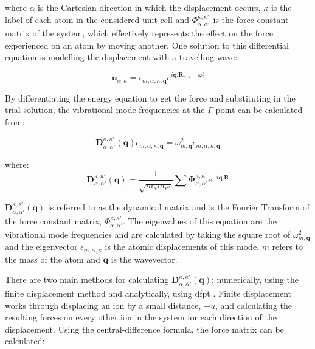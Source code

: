 where \(\alpha\) is the Cartesian direction in which the displacement occurs, \(\kappa\) is the label of each atom in the considered unit cell and \(\Phi_{\alpha, \alpha'}^{\kappa, \kappa'}\) is the force constant matrix of the system, which effectively represents the effect on the force experienced on an atom by moving another. One solution to this differential equation is modelling the displacement with a travelling wave:

\begin{equation}
\boldsymbol{u}_{\alpha, \kappa} = \epsilon_{m, \alpha, \kappa, \boldsymbol{q}}e^{i\boldsymbol{q}.\boldsymbol{R}_{\alpha, \kappa} - \omega t}
\end{equation}

By differentiating the energy equation to get the force and substituting in the trial solution, the vibrational mode frequencies at the \(\Gamma\)\nobreakdash-point can be calculated from:

\begin{equation}
\boldsymbol{D}_{\alpha, \alpha'}^{\kappa, \kappa'} (\boldsymbol{q}) \epsilon_{m, \alpha, \kappa, \boldsymbol{q}} = \omega^2_{m,\boldsymbol{q}} \epsilon_{m, \alpha, \kappa, \boldsymbol{q}}
\end{equation}

where:
\begin{equation}
\boldsymbol{D}_{\alpha, \alpha'}^{\kappa, \kappa'} (\boldsymbol{q}) = \frac{1}{\sqrt{m_{\kappa} m_{\kappa'}}} \sum \boldsymbol{\Phi}_{\alpha, \alpha'}^{\kappa, \kappa'} e^{-i\boldsymbol{q}.\boldsymbol{R}}
\end{equation}

\(\boldsymbol{D}_{\alpha, \alpha'}^{\kappa, \kappa'} (\boldsymbol{q})\) is referred to as the dynamical matrix and is the Fourier Transform of the force constant matrix, \(\Phi_{\alpha, \alpha'}^{\kappa, \kappa'}\). The eigenvalues of this equation are the vibrational mode frequencies and are calculated by taking the square root of \(\omega^2_{m,\boldsymbol{q}}\) and the eigenvector \(\epsilon_{m, \alpha, \kappa}\) is the atomic displacements of this mode. \(m\) refers to the mass of the atom and \(\boldsymbol{q}\) is the wavevector.

There are two main methods for calculating \(\boldsymbol{D}_{\alpha, \alpha'}^{\kappa, \kappa'} (\boldsymbol{q})\); numerically, using the finite displacement method and analytically, using \acrfull{dfpt} \DIFdelbegin \DIFdel{~}\DIFdelend \cite{Giannozzi2005}. Finite displacement \DIFdelbegin \DIFdel{~}\DIFdelend \cite{Kresse1995, Parlinski1997} works through displacing an ion by a small distance, \(\pm u\), and calculating the resulting forces on every other ion in the system for each direction of the displacement. Using the central-difference formula, the force matrix can be calculated:

